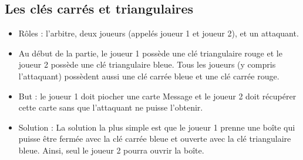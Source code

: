 \documentclass[a4paper,10pt]{article}
\begin{document}
\subsection{Les clés carrés et triangulaires}
\begin{itemize}
	\item Rôles : l'arbitre, deux joueurs (appelés joueur 1 et joueur 2), et un attaquant.
	\item Au début de la partie, le joueur 1 possède une clé triangulaire rouge et le joueur 2 possède une clé triangulaire bleue. Tous les joueurs (y compris l'attaquant) possèdent aussi une clé carrée bleue et une clé carrée rouge.
	\item But : le joueur 1 doit piocher une carte Message et le joueur 2 doit récupérer cette carte sans que l'attaquant ne puisse l'obtenir.
	\item Solution : La solution la plus simple est que le joueur 1 prenne une boîte qui puisse être fermée avec la clé carrée bleue et ouverte avec la clé triangulaire bleue. Ainsi, seul le joueur 2 pourra ouvrir la boîte.
\end{itemize}
\end{document}
